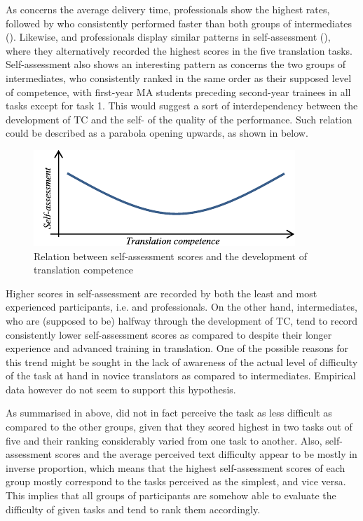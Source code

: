 \documentclass[output=paper]{LSP/langsci}
\begin{document}
As concerns the average delivery time, professionals show the highest rates, followed by  who consistently performed faster than both groups of intermediates (). Likewise,  and professionals display similar patterns in self-assessment (), where they alternatively recorded the highest scores in the five translation tasks. Self-assessment also shows an interesting pattern as concerns the two groups of intermediates, who consistently ranked in the same order as their supposed level of competence, with first-year MA students preceding second-year trainees in all tasks except for task 1. This would suggest a sort of interdependency between the development of TC and the self- of the quality of the performance. Such relation could be described as a parabola opening upwards, as shown in  below.

\begin{figure}
 \includegraphics[width=\textwidth]{figures/quinci/figure1.pdf}
 \caption{Relation between self-assessment scores and the development of translation competence}
 \label{quinci:fig:1}
\end{figure}

Higher scores in self-assessment are recorded by both the least and most experienced participants, i.e.  and professionals. On the other hand, intermediates, who are (supposed to be) halfway through the development of TC, tend to record consistently lower self-assessment scores as compared to  despite their longer experience and advanced training in translation. One of the possible reasons for this trend might be sought in the lack of awareness of the actual level of difficulty of the task at hand in novice translators as compared to intermediates. Empirical data however do not seem to support this hypothesis.

As summarised in  above,  did not in fact perceive the task as less difficult as compared to the other groups, given that they scored highest in two tasks out of five and their ranking considerably varied from one task to another. Also, self-assessment scores and the average perceived text difficulty appear to be mostly in inverse proportion, which means that the highest self-assessment scores of each group mostly correspond to the tasks perceived as the simplest, and vice versa. This implies that all groups of participants are somehow able to evaluate the difficulty of given tasks and tend to rank them accordingly.
\end{document}
